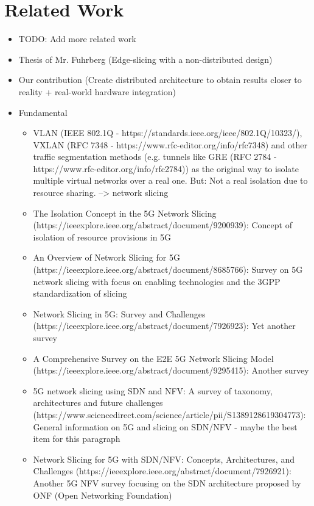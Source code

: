 \documentclass{article}
\begin{document}
\section{Related Work}
\iffalse
\begin{itemize}
    \item TODO: Add more related work
    \item Thesis of Mr. Fuhrberg (Edge-slicing with a non-distributed design)
    \item Our contribution (Create distributed architecture to obtain results closer to reality + real-world hardware integration)
\end{itemize}
\begin{itemize}
    \item Fundamental
    \begin{itemize}
        \item VLAN (IEEE 802.1Q - https://standards.ieee.org/ieee/802.1Q/10323/), VXLAN (RFC 7348 - https://www.rfc-editor.org/info/rfc7348) and other traffic segmentation methods (e.g. tunnels like GRE (RFC 2784 - https://www.rfc-editor.org/info/rfc2784)) as the original way to isolate multiple virtual networks over a real one. But: Not a real isolation due to resource sharing. --> network slicing
        \item The Isolation Concept in the 5G Network Slicing (https://ieeexplore.ieee.org/abstract/document/9200939): Concept of isolation of resource provisions in 5G
        \item An Overview of Network Slicing for 5G (https://ieeexplore.ieee.org/abstract/document/8685766): Survey on 5G network slicing with focus on enabling technologies and the 3GPP standardization of slicing
        \item Network Slicing in 5G: Survey and Challenges (https://ieeexplore.ieee.org/abstract/document/7926923): Yet another survey
        \item A Comprehensive Survey on the E2E 5G Network Slicing Model (https://ieeexplore.ieee.org/abstract/document/9295415): Another survey
        \item 5G network slicing using SDN and NFV: A survey of taxonomy, architectures and future challenges (https://www.sciencedirect.com/science/article/pii/S1389128619304773): General information on 5G and slicing on SDN/NFV - maybe the best item for this paragraph
        \item Network Slicing for 5G with SDN/NFV: Concepts, Architectures, and Challenges (https://ieeexplore.ieee.org/abstract/document/7926921): Another 5G NFV survey focusing on the SDN architecture proposed by ONF (Open Networking Foundation)

\end{itemize}
\end{itemize}
\end{document}
